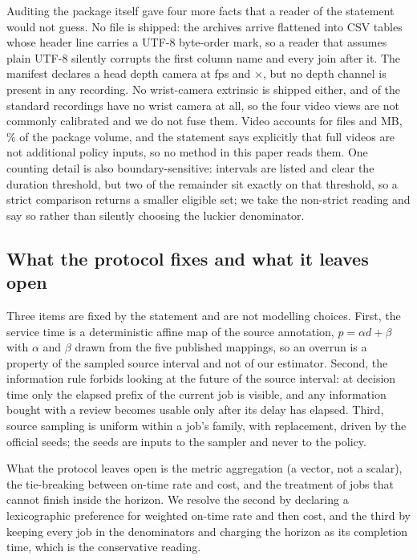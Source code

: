 \documentclass{swmcmthesis}
\begin{document}
Auditing the package itself gave four more facts that a reader of the statement
would not guess. No  file is shipped: the archives arrive flattened into
CSV tables whose header line carries a UTF-8 byte-order mark, so a reader that
assumes plain UTF-8 silently corrupts the first column name and every join after it.
The manifest declares a head depth camera at \slotDepthFPS{} fps and
\slotDepthW{}$\times$\slotDepthH{}, but no depth channel is present in any
recording. No wrist-camera extrinsic is shipped either, and \slotStdNoWrist{} of the
\slotStdRecords{} standard recordings have no wrist camera at all, so the four video
views are not commonly calibrated and we do not fuse them. Video accounts for
\slotNVideos{} files and \slotVideoMB{} MB, \slotVideoShare{}\% of the package
volume, and the statement says explicitly that full videos are not additional policy
inputs, so no method in this paper reads them. One counting detail is also
boundary-sensitive: \slotNIntervals{} intervals are listed and \slotNEligible{} clear
the duration threshold, but two of the remainder sit exactly on that threshold, so a
strict comparison returns a smaller eligible set; we take the non-strict reading and
say so rather than silently choosing the luckier denominator.

\subsection{What the protocol fixes and what it leaves open}
\label{sec:protocol}

Three items are fixed by the statement and are not modelling choices. First, the
service time is a deterministic affine map of the source annotation,
$p=\alpha d+\beta$ with $\alpha$ and $\beta$ drawn from the five published
mappings, so an overrun is a property of the sampled source interval and not of
our estimator. Second, the information rule forbids looking at the future of the
source interval: at decision time only the elapsed prefix of the current job is
visible, and any information bought with a review becomes usable only after its
delay has elapsed. Third, source sampling is uniform within a job's family, with
replacement, driven by the official seeds; the seeds are inputs to the sampler and
never to the policy.

What the protocol leaves open is the metric aggregation (a vector, not a scalar),
the tie-breaking between on-time rate and cost, and the treatment of jobs that
cannot finish inside the horizon. We resolve the second by declaring a
lexicographic preference for weighted on-time rate and then cost, and the third by
keeping every job in the denominators and charging the horizon as its completion
time, which is the conservative reading.
\end{document}
